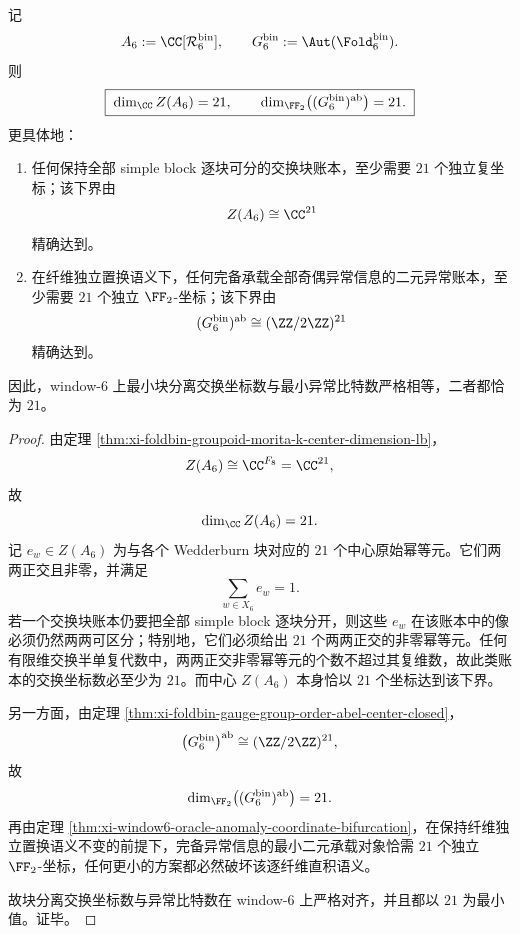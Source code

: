 \begin{theorem}\label{thm:xi-time-part60acb-window6-center-anomaly-bit-alignment}
记
\[
A_6:=\CC[\mathcal R_6^{\mathrm{bin}}],
\qquad
G_6^{\mathrm{bin}}:=\Aut(\Fold_6^{\mathrm{bin}}).
\]
则
\[
\boxed{\;
\dim_{\CC}Z(A_6)=21,
\qquad
\dim_{\FF_2}\bigl((G_6^{\mathrm{bin}})^{\mathrm{ab}}\bigr)=21.\;}
\]
更具体地：
\begin{enumerate}
  \item 任何保持全部 simple block 逐块可分的交换块账本，至少需要 \(21\) 个独立复坐标；该下界由
  \[
  Z(A_6)\cong \CC^{21}
  \]
  精确达到。
  \item 在纤维独立置换语义下，任何完备承载全部奇偶异常信息的二元异常账本，至少需要 \(21\) 个独立 \(\FF_2\)-坐标；该下界由
  \[
  (G_6^{\mathrm{bin}})^{\mathrm{ab}}\cong (\ZZ/2\ZZ)^{21}
  \]
  精确达到。
\end{enumerate}
因此，window-\(6\) 上最小块分离交换坐标数与最小异常比特数严格相等，二者都恰为 \(21\)。
\end{theorem}
\begin{proof}
由定理 \ref{thm:xi-foldbin-groupoid-morita-k-center-dimension-lb}，
\[
Z(A_6)\cong \CC^{F_8}=\CC^{21},
\]
故
\[
\dim_{\CC}Z(A_6)=21.
\]
记 \(e_w\in Z(A_6)\) 为与各个 Wedderburn 块对应的 \(21\) 个中心原始幂等元。它们两两正交且非零，并满足
\[
\sum_{w\in X_6}e_w=1.
\]
若一个交换块账本仍要把全部 simple block 逐块分开，则这些 \(e_w\) 在该账本中的像必须仍然两两可区分；特别地，它们必须给出 \(21\) 个两两正交的非零幂等元。任何有限维交换半单复代数中，两两正交非零幂等元的个数不超过其复维数，故此类账本的交换坐标数必至少为 \(21\)。而中心 \(Z(A_6)\) 本身恰以 \(21\) 个坐标达到该下界。

另一方面，由定理 \ref{thm:xi-foldbin-gauge-group-order-abel-center-closed}，
\[
\bigl(G_6^{\mathrm{bin}}\bigr)^{\mathrm{ab}}\cong (\ZZ/2\ZZ)^{21},
\]
故
\[
\dim_{\FF_2}\bigl((G_6^{\mathrm{bin}})^{\mathrm{ab}}\bigr)=21.
\]
再由定理 \ref{thm:xi-window6-oracle-anomaly-coordinate-bifurcation}，在保持纤维独立置换语义不变的前提下，完备异常信息的最小二元承载对象恰需 \(21\) 个独立 \(\FF_2\)-坐标，任何更小的方案都必然破坏该逐纤维直积语义。

故块分离交换坐标数与异常比特数在 window-\(6\) 上严格对齐，并且都以 \(21\) 为最小值。证毕。
\end{proof}

